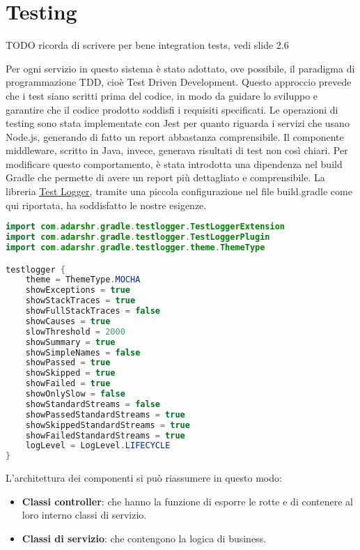 \chapter{Testing}
\label{ch:testing}

TODO ricorda di scrivere per bene integration tests, vedi slide 2.6

Per ogni servizio in questo sistema è stato adottato, ove possibile, il paradigma di programmazione TDD, cioè Test Driven Development. Questo approccio prevede che i test siano scritti prima del codice, in modo da guidare lo sviluppo e garantire che il codice prodotto soddisfi i requisiti specificati.
Le operazioni di testing sono stata implementate con Jest per quanto riguarda i servizi che usano Node.js, generando di fatto un report abbastanza comprensibile. Il componente middleware, scritto in Java, invece, generava risultati di test non così chiari. Per modificare questo comportamento, è stata introdotta una dipendenza nel build Gradle che permette di avere un report più dettagliato e comprensibile. 
La libreria \href{https://plugins.gradle.org/plugin/com.adarshr.test-logger}{\underline{Test Logger}}, tramite una piccola configurazione nel file build.gradle come qui riportata, ha soddisfatto le nostre esigenze.

\begin{lstlisting}[language=Java, caption={Test logger}, label=list:gradle_testlogger]
import com.adarshr.gradle.testlogger.TestLoggerExtension
import com.adarshr.gradle.testlogger.TestLoggerPlugin
import com.adarshr.gradle.testlogger.theme.ThemeType

testlogger {
    theme = ThemeType.MOCHA
    showExceptions = true
    showStackTraces = true
    showFullStackTraces = false
    showCauses = true
    slowThreshold = 2000
    showSummary = true
    showSimpleNames = false
    showPassed = true
    showSkipped = true
    showFailed = true
    showOnlySlow = false
    showStandardStreams = false
    showPassedStandardStreams = true
    showSkippedStandardStreams = true
    showFailedStandardStreams = true
    logLevel = LogLevel.LIFECYCLE
}
\end{lstlisting}
\vspace{1cm}

L'architettura dei componenti si può riassumere in questo modo:
\begin{itemize}
	\item \textbf{Classi controller}: che hanno la funzione di esporre le rotte e di contenere al loro interno classi di servizio.
	\item \textbf{Classi di servizio}: che contengono la logica di business.
\end{itemize}

